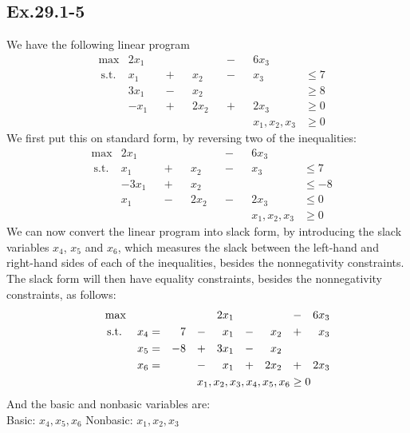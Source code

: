 \subsection*{Ex.29.1-5}

We have the following linear program
$$
\begin{aligned}
 & \max & 2x_1 && && && - && 6x_3 & 
\\
 & \ \text{s.t.} & x_1 && + && x_2 && - && x_3 & \leq 7
\\
 & & 3x_1 && - && x_2 && && & \geq 8
\\
 & & -x_1 && + && 2x_2 && + && 2x_3 & \geq 0
\\
 & & && && && && x_1,x_2,x_3 & \geq 0
\end{aligned}
$$
We first put this on standard form, by reversing two of the inequalities:
$$
\begin{aligned}
 & \max & 2x_1 && && && - && 6x_3 & 
\\
 & \ \text{s.t.} & x_1 && + && x_2 && - && x_3 & \leq 7
\\
 & & -3x_1 && + && x_2 && && & \leq -8
\\
 & & x_1 && - && 2x_2 && - && 2x_3 & \leq 0
\\
 & & && && && && x_1,x_2,x_3 & \geq 0
\end{aligned}
$$
We can now convert the linear program into slack form, by introducing the slack variables $x_4$, $x_5$ and $x_6$, which measures the slack between the left-hand and right-hand sides of each of the inequalities, besides the nonnegativity constraints.
\\
The slack form will then have equality constraints, besides the nonnegativity constraints, as follows:
$$
\begin{aligned}
 & \max & && && && 2x_1 && && && - && 6x_3
\\
 & \ \text{s.t.} & x_4 = && 7 && - && x_1 && - && x_2 && + && x_3 &
\\
 & & x_5 = && -8 && + && 3x_1 && - && x_2 && &&
\\
 & & x_6 = &&  && - && x_1 && + && 2x_2 && + && 2x_3
\\
 & & && && x_1,x_2,x_3,x_4,x_5,x_6 \geq 0 \span\span\span\span\span\span\span\span\span\span\span\span
\end{aligned}
$$
And the basic and nonbasic variables are:
\\
Basic: $x_4,x_5,x_6$
Nonbasic: $x_1,x_2,x_3$